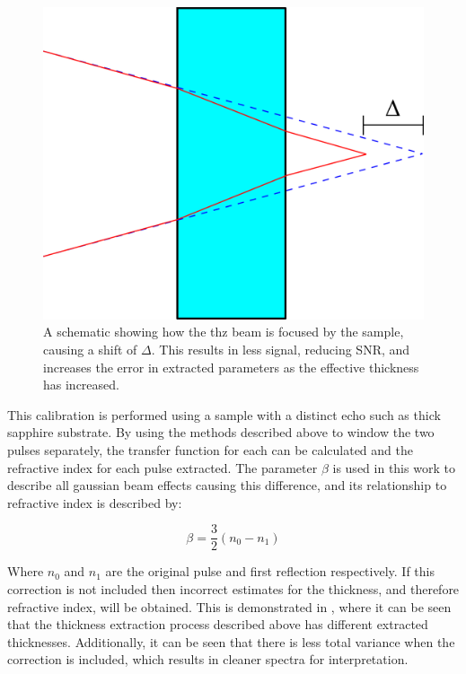 \begin{figure}
    \centering
    \includegraphics{Figures/Misc/Theory/GuoyPhaseShift.png}
    \captionsetup{font = footnotesize, justification = centering}
    \caption{A schematic showing how the \acrshort{thz} beam is focused by the sample, causing a shift of \(\Delta\). This results in less signal, reducing SNR, and increases the error in extracted parameters as the effective thickness has increased.}
    \label{fig:guoy}
\end{figure}

This calibration is performed using a sample with a distinct echo such as thick sapphire substrate. By using the methods described above to window the two pulses separately, the transfer function for each can be calculated and the refractive index for each pulse extracted. The parameter \(\beta\) is used in this work to describe all gaussian beam effects causing this difference, and its relationship to refractive index is described by:

\begin{equation}
\beta = \frac{3}{2}(n_0 - n_1)
\end{equation}

Where \(n_0\) and \(n_1\) are the original pulse and first reflection respectively. If this correction is not included then incorrect estimates for the thickness, and therefore refractive index, will be obtained. This is demonstrated in , where it can be seen that the thickness extraction process described above has different extracted thicknesses. Additionally, it can be seen that there is less total variance when the correction is included, which results in cleaner spectra for interpretation. 

